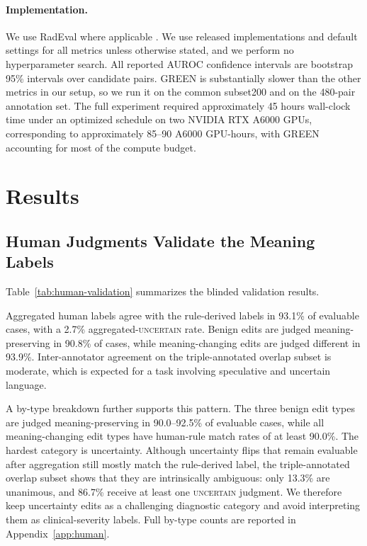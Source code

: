 \documentclass[11pt]{article}
\newcommand{\uncertain}{\textsc{uncertain}\xspace}
\begin{document}
\paragraph{Implementation.}
We use RadEval where applicable \citep{xu-etal-2025-radeval}. 
We use released implementations and default settings for all metrics unless otherwise stated, and we perform no hyperparameter search. 
All reported AUROC confidence intervals are bootstrap 95\% intervals over candidate pairs. 
GREEN is substantially slower than the other metrics in our setup, so we run it on the common subset200 and on the 480-pair annotation set. 
The full experiment required approximately 45 hours wall-clock time under an optimized schedule on two NVIDIA RTX A6000 GPUs, corresponding to approximately 85--90 A6000 GPU-hours, with GREEN accounting for most of the compute budget.

\section{Results}

\subsection{Human Judgments Validate the Meaning Labels}

Table~\ref{tab:human-validation} summarizes the blinded validation results.


Aggregated human labels agree with the rule-derived labels in 93.1\% of evaluable cases, with a 2.7\% aggregated-\uncertain rate.
Benign edits are judged meaning-preserving in 90.8\% of cases, while meaning-changing edits are judged different in 93.9\%.
Inter-annotator agreement on the triple-annotated overlap subset is moderate, which is expected for a task involving speculative and uncertain language.

A by-type breakdown further supports this pattern. The three benign edit types are judged meaning-preserving in 90.0--92.5\% of evaluable cases, while all meaning-changing edit types have human-rule match rates of at least 90.0\%. 
The hardest category is uncertainty. Although uncertainty flips that remain evaluable after aggregation still mostly match the rule-derived label, the triple-annotated overlap subset shows that they are intrinsically ambiguous: only 13.3\% are unanimous, and 86.7\% receive at least one \uncertain judgment. 
We therefore keep uncertainty edits as a challenging diagnostic category and avoid interpreting them as clinical-severity labels. 
Full by-type counts are reported in Appendix~\ref{app:human}.
\end{document}
